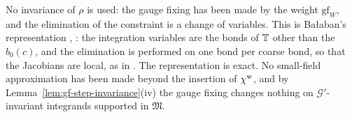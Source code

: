 No invariance of $\rho$ is used: the gauge fixing has been made by the weight $\mathrm{gf}_W$, and the elimination of the constraint is a change of variables. This is Ba\l aban's representation \cite[(0.16)--(0.19)]{BalYM4I}, \cite[(2.3)--(2.7)]{BalYM4II}: the integration variables are the bonds of $\mathbb T$ other than the $b_0(c)$, and the elimination is performed on one bond per coarse bond, so that the Jacobians are local, as in \cite[(17), (20)]{BalUV3}. The representation is exact. No small-field approximation has been made beyond the insertion of $\chi^{\rm w}$, and by Lemma~\ref{lem:gf-step-invariance}(iv) the gauge fixing changes nothing on $\mathcal G'$-invariant integrands supported in $\mathfrak M$.
